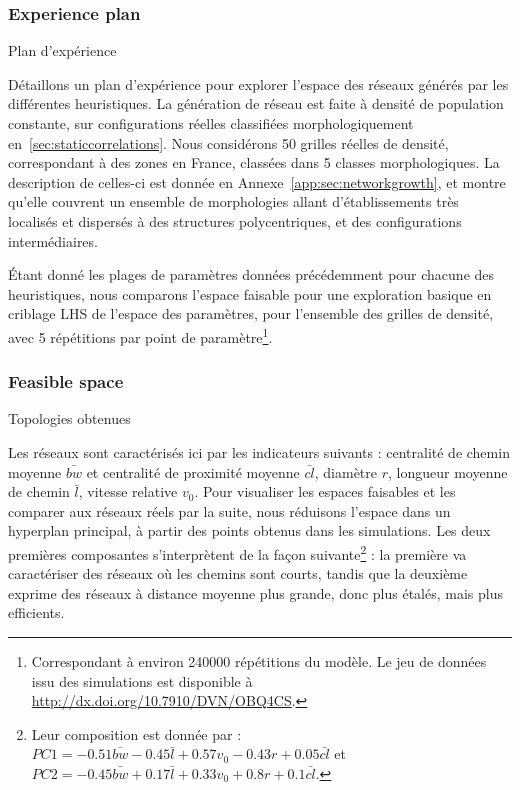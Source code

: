 \subsubsection{Experience plan}{Plan d'expérience}


Détaillons un plan d'expérience pour explorer l'espace des réseaux générés par les différentes heuristiques. La génération de réseau est faite à densité de population constante, sur configurations réelles classifiées morphologiquement en~\ref{sec:staticcorrelations}. Nous considérons 50 grilles réelles de densité, correspondant à des zones en France, classées dans 5 classes morphologiques. La description de celles-ci est donnée en Annexe~\ref{app:sec:networkgrowth}, et montre qu'elle couvrent un ensemble de morphologies allant d'établissements très localisés et dispersés à des structures polycentriques, et des configurations intermédiaires.


Étant donné les plages de paramètres données précédemment pour chacune des heuristiques, nous comparons l'espace faisable pour une exploration basique en criblage LHS de l'espace des paramètres, pour l'ensemble des grilles de densité, avec 5 répétitions par point de paramètre\footnote{Correspondant à environ 240000 répétitions du modèle. Le jeu de données issu des simulations est disponible à \url{http://dx.doi.org/10.7910/DVN/OBQ4CS}.}.

\subsubsection{Feasible space}{Topologies obtenues}

Les réseaux sont caractérisés ici par les indicateurs suivants : centralité de chemin moyenne $\bar{bw}$ et centralité de proximité moyenne $\bar{cl}$, diamètre $r$, longueur moyenne de chemin $\bar{l}$, vitesse relative $v_0$. Pour visualiser les espaces faisables et les comparer aux réseaux réels par la suite, nous réduisons l'espace dans un hyperplan principal, à partir des points obtenus dans les simulations. Les deux premières composantes s'interprètent de la façon suivante\footnote{Leur composition est donnée par : $PC1 = - 0.51 \bar{bw} - 0.45 \bar{l} + 0.57 v_0 - 0.43 r + 0.05 \bar{cl}$ et $PC2 = -0.45 \bar{bw} + 0.17 \bar{l} +0.33 v_0 + 0.8 r +0.1 \bar{cl}$.} : la première va caractériser des réseaux où les chemins sont courts, tandis que la deuxième exprime des réseaux à distance moyenne plus grande, donc plus étalés, mais plus efficients. 

